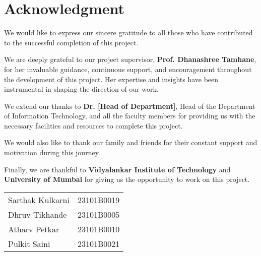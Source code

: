 \chapter*{Acknowledgment}
\thispagestyle{empty}

We would like to express our sincere gratitude to all those who have contributed to the successful completion of this project.

We are deeply grateful to our project supervisor, \textbf{Prof. Dhanashree Tamhane}, for her invaluable guidance, continuous support, and encouragement throughout the development of this project. Her expertise and insights have been instrumental in shaping the direction of our work.

We extend our thanks to \textbf{Dr. [Head of Department]}, Head of the Department of Information Technology, and all the faculty members for providing us with the necessary facilities and resources to complete this project.

We would also like to thank our family and friends for their constant support and motivation during this journey.

Finally, we are thankful to \textbf{Vidyalankar Institute of Technology} and \textbf{University of Mumbai} for giving us the opportunity to work on this project.

\vspace{2cm}

\noindent\begin{tabular}{@{}ll}
    Sarthak Kulkarni & 23101B0019 \\
    Dhruv Tikhande & 23101B0005 \\
    Atharv Petkar & 23101B0010 \\
    Pulkit Saini & 23101B0021 \\
\end{tabular}
